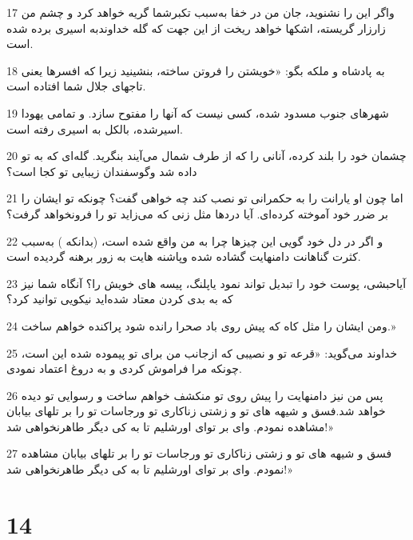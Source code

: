 \par 17 واگر این را نشنوید، جان من در خفا به‌سبب تکبرشما گریه خواهد کرد و چشم من زارزار گریسته، اشکها خواهد ریخت از این جهت که گله خداوندبه اسیری برده شده است.
\par 18 به پادشاه و ملکه بگو: «خویشتن را فروتن ساخته، بنشینید زیرا که افسرها یعنی تاجهای جلال شما افتاده است.
\par 19 شهرهای جنوب مسدود شده، کسی نیست که آنها را مفتوح سازد. و تمامی یهودا اسیرشده، بالکل به اسیری رفته است.
\par 20 چشمان خود را بلند کرده، آنانی را که از طرف شمال می‌آیند بنگرید. گله‌ای که به تو داده شد وگوسفندان زیبایی تو کجا است؟
\par 21 اما چون او یارانت را به حکمرانی تو نصب کند چه خواهی گفت؟ چونکه تو ایشان را بر ضرر خود آموخته کرده‌ای. آیا دردها مثل زنی که می‌زاید تو را فرونخواهد گرفت؟
\par 22 و اگر در دل خود گویی این چیزها چرا به من واقع شده است، (بدانکه ) به‌سبب کثرت گناهانت دامنهایت گشاده شده وپاشنه هایت به زور برهنه گردیده است.
\par 23 آیاحبشی، پوست خود را تبدیل تواند نمود یاپلنگ، پیسه های خویش را؟ آنگاه شما نیز که به بدی کردن معتاد شده‌اید نیکویی توانید کرد؟
\par 24 ومن ایشان را مثل کاه که پیش روی باد صحرا رانده شود پراکنده خواهم ساخت.»
\par 25 خداوند می‌گوید: «قرعه تو و نصیبی که ازجانب من برای تو پیموده شده این است، چونکه مرا فراموش کردی و به دروغ اعتماد نمودی.
\par 26 پس من نیز دامنهایت را پیش روی تو منکشف خواهم ساخت و رسوایی تو دیده خواهد شد.فسق و شیهه های تو و زشتی زناکاری تو ورجاسات تو را بر تلهای بیابان مشاهده نمودم. وای بر تو‌ای اورشلیم تا به کی دیگر طاهرنخواهی شد!»
\par 27 فسق و شیهه های تو و زشتی زناکاری تو ورجاسات تو را بر تلهای بیابان مشاهده نمودم. وای بر تو‌ای اورشلیم تا به کی دیگر طاهرنخواهی شد!»
 
\chapter{14}

